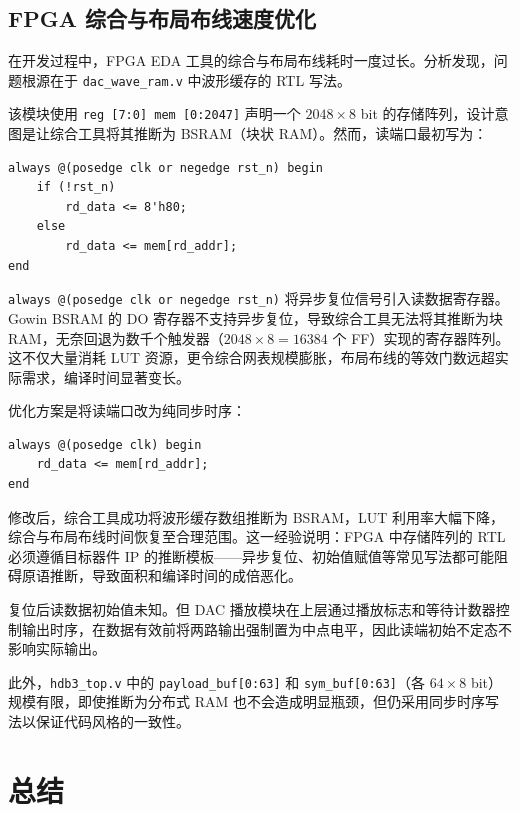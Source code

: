 \documentclass[UTF8,a4paper,12pt]{ctexart}
\begin{document}
\subsection{FPGA 综合与布局布线速度优化}

在开发过程中，FPGA EDA 工具的综合与布局布线耗时一度过长。分析发现，问题根源在于 \texttt{dac\_wave\_ram.v} 中波形缓存的 RTL 写法。

该模块使用 \texttt{reg [7:0] mem [0:2047]} 声明一个 $2048 \times 8$ bit 的存储阵列，设计意图是让综合工具将其推断为 BSRAM（块状 RAM）。然而，读端口最初写为：

\begin{lstlisting}[style=VerilogStyle,caption={优化前的读端口时序（关键问题）},label={lst:ram_bad}]
always @(posedge clk or negedge rst_n) begin
    if (!rst_n)
        rd_data <= 8'h80;
    else
        rd_data <= mem[rd_addr];
end
\end{lstlisting}

\texttt{always @(posedge clk or negedge rst\_n)} 将异步复位信号引入读数据寄存器。Gowin BSRAM 的 DO 寄存器不支持异步复位，导致综合工具无法将其推断为块 RAM，无奈回退为数千个触发器（$2048 \times 8 = 16384$ 个 FF）实现的寄存器阵列。这不仅大量消耗 LUT 资源，更令综合网表规模膨胀，布局布线的等效门数远超实际需求，编译时间显著变长。

优化方案是将读端口改为纯同步时序：

\begin{lstlisting}[style=VerilogStyle,caption={优化后的读端口（纯同步，可推断为 BSRAM）},label={lst:ram_good}]
always @(posedge clk) begin
    rd_data <= mem[rd_addr];
end
\end{lstlisting}

修改后，综合工具成功将波形缓存数组推断为 BSRAM，LUT 利用率大幅下降，综合与布局布线时间恢复至合理范围。这一经验说明：FPGA 中存储阵列的 RTL 必须遵循目标器件 IP 的推断模板——异步复位、初始值赋值等常见写法都可能阻碍原语推断，导致面积和编译时间的成倍恶化。

复位后读数据初始值未知。但 DAC 播放模块在上层通过播放标志和等待计数器控制输出时序，在数据有效前将两路输出强制置为中点电平，因此读端初始不定态不影响实际输出。

此外，\texttt{hdb3\_top.v} 中的 \texttt{payload\_buf[0:63]} 和 \texttt{sym\_buf[0:63]}（各 $64 \times 8$ bit）规模有限，即使推断为分布式 RAM 也不会造成明显瓶颈，但仍采用同步时序写法以保证代码风格的一致性。

\newpage
\section{总结}
\end{document}
